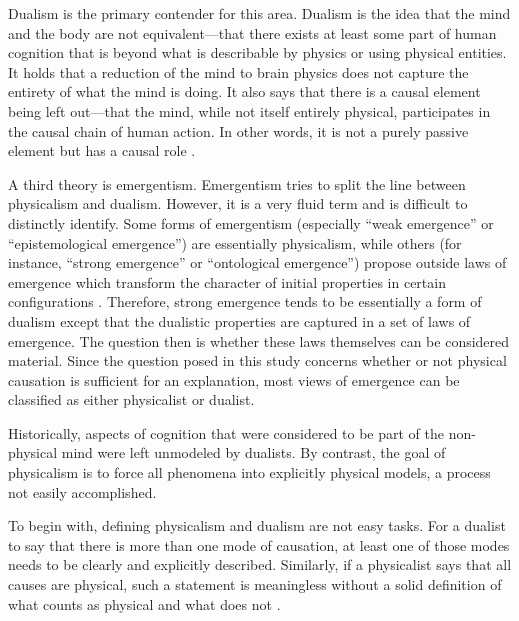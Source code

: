 Dualism is the primary contender for this area.  Dualism is the idea that the mind and the body are not equivalent---that there exists at least some part of human cognition that is beyond what is describable by physics or using physical entities.  It holds that a reduction of the mind to brain physics does not capture the entirety of what the mind is doing.  It also says that there is a causal element being left out---that the mind, while not itself entirely physical, participates in the causal chain of human action.  In other words, it is not a purely passive element but has a causal role \citep{heart1994}.

A third theory is emergentism.  Emergentism tries to split the line between physicalism and dualism.  However, it is a very fluid term and is difficult to distinctly identify.  Some forms of emergentism (especially ``weak emergence'' or ``epistemological emergence'') are essentially physicalism, while others (for instance, ``strong emergence'' or ``ontological emergence'') propose outside laws of emergence which transform the character of initial properties in certain configurations \citep{oconnorwong2012}.  Therefore, strong emergence tends to be essentially a form of dualism except that the dualistic properties are captured in a set of laws of emergence.  The question then is whether these laws themselves can be considered material.  Since the question posed in this study concerns whether or not physical causation is sufficient for an explanation, most views of emergence can be classified as either physicalist or dualist.

Historically, aspects of cognition that were considered to be part of the non-physical mind were left unmodeled by dualists.  By contrast, the goal of physicalism is to force all phenomena into explicitly physical models, a process not easily accomplished.

To begin with, defining physicalism and dualism are not easy tasks. For a dualist to say that there is more than one mode of causation, at least one of those modes needs to be clearly and explicitly described.  Similarly, if a physicalist says that all causes are physical, such a statement is meaningless without a solid definition of what counts as physical and what does not \citep{stoljar2009}.

